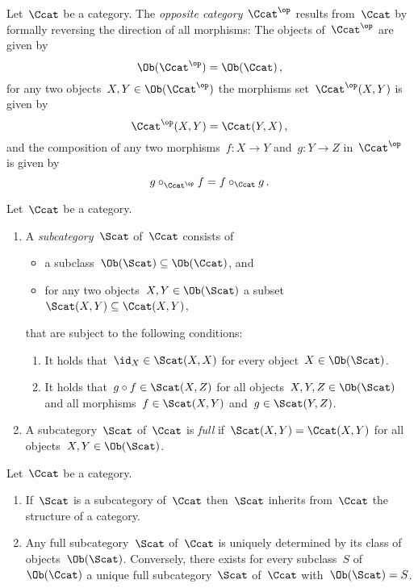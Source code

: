 \begin{definition}
  Let~$\Ccat$ be a category.
  The \emph{opposite category}~$\Ccat^\op$ results from~$\Ccat$ by formally reversing the direction of all morphisms:
  The objects of~$\Ccat^\op$ are given by
  \[
      \Ob(\Ccat^\op)
    = \Ob(\Ccat) \,,
  \]
  for any two objects~$X, Y \in \Ob(\Ccat^\op)$ the morphisms set~$\Ccat^\op(X,Y)$ is given by
  \[
      \Ccat^\op(X,Y)
    = \Ccat(Y,X) \,,
  \]
  and the composition of any two morphisms~$f \colon X \to Y$ and~$g \colon Y \to Z$ in~$\Ccat^\op$ is given by
  \[
      g \circ_{\Ccat^\op} f
    = f \circ_{\Ccat} g \,.
  \]
\end{definition}


\begin{definition*}
  Let~$\Ccat$ be a category.
  \begin{enumerate}
    \item 
      A \emph{subcategory}~$\Scat$ of~$\Ccat$ consists of
      \begin{itemize}
        \item
          a subclass~$\Ob(\Scat) \subseteq \Ob(\Ccat)$, and
        \item
          for any two objects~$X, Y \in \Ob(\Scat)$ a subset~$\Scat(X,Y) \subseteq \Ccat(X,Y)$,
      \end{itemize}
      that are subject to the following conditions:
      \begin{enumerate}[label=(S\arabic*)]
        \item
          It holds that~$\id_X \in \Scat(X,X)$ for every object~$X \in \Ob(\Scat)$.
        \item
          It holds that~$g \circ f \in \Scat(X,Z)$ for all objects~$X, Y, Z \in \Ob(\Scat)$ and all morphisms~$f \in \Scat(X,Y)$ and~$g \in \Scat(Y,Z)$.
      \end{enumerate}
    \item
      A subcategory~$\Scat$ of~$\Ccat$ is \emph{full} if~$\Scat(X,Y) = \Ccat(X,Y)$ for all objects~$X, Y \in \Ob(\Scat)$.
  \end{enumerate}
\end{definition*}


\begin{remark*}
  Let~$\Ccat$ be a category.
  \begin{enumerate}
    \item
      If~$\Scat$ is a subcategory of~$\Ccat$ then~$\Scat$ inherits from~$\Ccat$ the structure of a category.
    \item
      Any full subcategory~$\Scat$ of~$\Ccat$ is uniquely determined by its class of objects~$\Ob(\Scat)$.
      Conversely, there exists for every subclass~$S$ of~$\Ob(\Ccat)$ a unique full subcategory~$\Scat$ of~$\Ccat$ with~$\Ob(\Scat) = S$.
  \end{enumerate}
\end{remark*}






